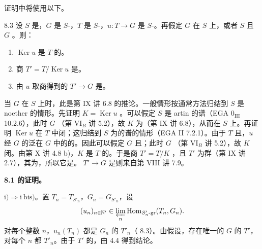 证明中将使用以下。
\begin{SGAresult}{}{8.3}
设 $S$ 是，$G$ 是 $S$-，$T$ 是 $S$-，$u:T\to G$ 是 $S$-。再假定 $G$ 在 $S$ 上，或者 $S$ 且 $G$ 。则：
\begin{enumerate}
\item[a)] $\operatorname{Ker}u$ 是 $T$ 的。
\item[b)] 商 $T'=T/\operatorname{Ker}u$ 是。
\item[c)] 由 $u$ 取商得到的 $T'\to G$ 是。
\end{enumerate}
\end{SGAresult}
当 $G$ 在 $S$ 上时，此是第 IX 讲 6.8 的推论。一般情形按通常方法归结到 $S$ 是 noether 的情形。先证明 $K=\operatorname{Ker}u$ 。可以假定 $S$ 是 artin 的谱（EGA $0_{\mathrm{III}}$ 10.2.6），此时 $G$ （第 VI$_B$ 讲 5.2），故 $K$ 为（第 IX 讲 6.8），从而在 $S$ 上。再证明 $\operatorname{Ker}u$ 在 $T$ 中闭；这归结到 $S$ 为的谱的情形（EGA II 7.2.1）。由于 $T$ 且，$u$ 经 $G$ 的泛在 $G$ 中的的。因此可以假定 $G$ 且；此时 $G$ （第 VI$_B$ 讲 5.2），故 $K$ 闭。由第 X 讲 4.8 b)，$K$ 是 $T$ 的。于是商 $T'=T/K$ ，且 $T'$ 为群（第 IX 讲 2.7），其为，所以它是。 $T'\to G$ 是则来自第 VIII 讲 7.9。

\textbf{8.1 的证明。}

$\mathrm{i)}\Rightarrow\mathrm{i\ bis)}$。置 $T_n=T_{S'_n}$，$G_n=G_{S'_n}$，设
\[(u_n)_{n\in\mathbb N'}\in\varprojlim_n\operatorname{Hom}_{S'_n\text{-}\mathrm{gr}}(T_n,G_n).\]
对每个整数 $n$，$u_n(T_n)$ 都是 $G_n$ 的 $T'_n$（ 8.3）。由假设，存在唯一的 $G$ 的 $T'$，对每个 $n$ 都 $T'_n$。由于 $T'$ 的，由 4.4 得到结论。

